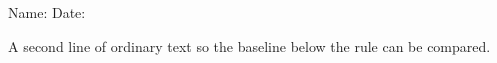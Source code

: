 \documentclass{article}
\begin{document}
Name: \hrulefill{} Date: \hrulefill

A second line of ordinary text so the baseline below the rule can be compared.
\end{document}
